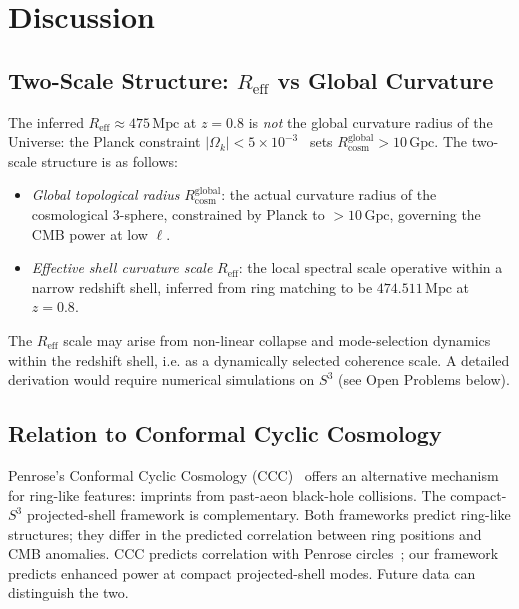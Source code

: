 \documentclass[
  aps,
  prd,
  reprint,
  superscriptaddress,
  nofootinbib,
  longbibliography,
  floatfix,
  amsmath,
  amssymb
]{revtex4-2}
\theoremstyle{plain}
\theoremstyle{definition}
\theoremstyle{remark}
\newcommand{\Sthree}{S^3}
\newcommand{\Reff}{R_{\mathrm{eff}}}
\newcommand{\Rcosm}{R_{\mathrm{cosm}}}
\begin{document}
\section{Discussion}
\label{sec:discussion}

\subsection{Two-Scale Structure: $\Reff$ vs Global Curvature}

The inferred $\Reff\approx 475\,\mathrm{Mpc}$ at $z=0.8$ is \emph{not}
the global curvature radius of the Universe: the Planck constraint
$|\Omega_k|<5\times 10^{-3}$~\cite{Planck2016} sets
$\Rcosm^{\mathrm{global}}>10\,\mathrm{Gpc}$. The two-scale structure
is as follows:

\begin{itemize}[noitemsep]
\item \emph{Global topological radius} $\Rcosm^{\mathrm{global}}$:
  the actual curvature radius of the cosmological 3-sphere, constrained
  by Planck to $>10\,\mathrm{Gpc}$, governing the CMB power at low $\ell$.
\item \emph{Effective shell curvature scale} $\Reff$: the local
  spectral scale operative within a narrow redshift shell, inferred
  from ring matching to be $474.511\,\mathrm{Mpc}$ at $z=0.8$.
\end{itemize}

The $\Reff$ scale may arise from non-linear collapse and mode-selection
dynamics within the redshift shell, i.e. as a dynamically selected
coherence scale. A detailed derivation would require numerical
simulations on $\Sthree$ (see Open Problems below).

\subsection{Relation to Conformal Cyclic Cosmology}

Penrose's Conformal Cyclic Cosmology (CCC)~\cite{Penrose2014} offers an
alternative mechanism for ring-like features: imprints from
past-aeon black-hole collisions. The compact-$\Sthree$ projected-shell framework is
complementary. Both frameworks predict ring-like structures;
they differ in the predicted correlation between ring positions and
CMB anomalies. CCC predicts correlation with Penrose
circles~\cite{Gurzadyan2013}; our framework predicts enhanced power at
compact projected-shell modes. Future data can distinguish the two.
\end{document}
